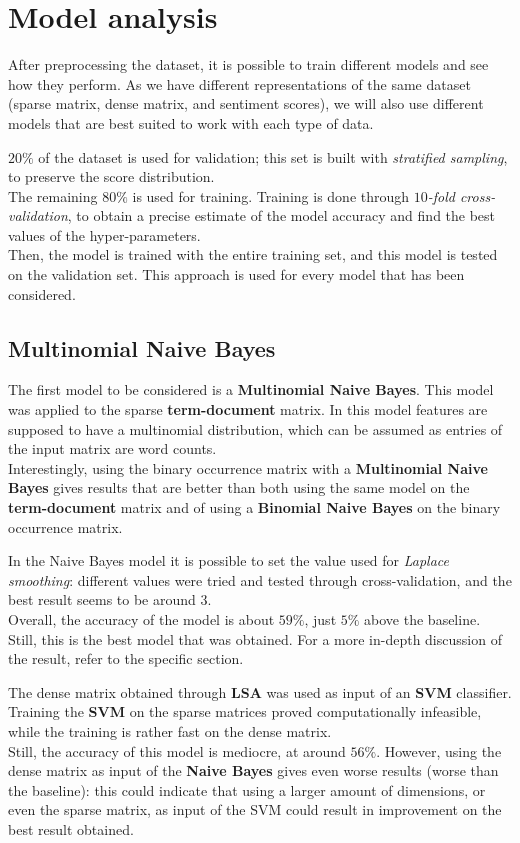 \documentclass[
12pt,
a4paper,
oneside,
headinclude,
footinclude]{article}
\theoremstyle{definition} %
\begin{document}
\section{Model analysis}
After preprocessing the dataset, it is possible to train different models and see how they perform. As we have different representations of the same dataset (sparse matrix, dense matrix, and sentiment scores), we will also use different models that are best suited to work with each type of data.

$20\%$ of the dataset is used for validation; this set is built with \textit{stratified sampling}, to preserve the score distribution.\\
The remaining $80\%$ is used for training. Training is done through \textit{$10$-fold cross-validation}, to obtain a precise estimate of the model accuracy and find the best values of the hyper-parameters. \\
Then, the model is trained with the entire training set, and this model is tested on the validation set.
This approach is used for every model that has been considered.

\subsection{Multinomial Naive Bayes}
The first model to be considered is a \textbf{Multinomial Naive Bayes}. This model was applied to the sparse \textbf{term-document} matrix. In this model features are supposed to have a multinomial distribution, which can be assumed as entries of the input matrix are word counts. \\
Interestingly, using the binary occurrence matrix with a \textbf{Multinomial Naive Bayes} gives results that are better than both using the same model on the \textbf{term-document} matrix and of using a \textbf{Binomial Naive Bayes} on the binary occurrence matrix.

In the Naive Bayes model it is possible to set the value used for \textit{Laplace smoothing}: different values were tried and tested through cross-validation, and the best result seems to be around $3$.\\
Overall, the accuracy of the model is about $59\%$, just $5\%$ above the baseline. Still, this is the best model that was obtained. For a more in-depth discussion of the result, refer to the specific section.

The dense matrix obtained through \textbf{LSA} was used as input of an \textbf{SVM} classifier. Training the \textbf{SVM} on the sparse matrices proved computationally infeasible, while the training is rather fast on the dense matrix. \\
Still, the accuracy of this model is mediocre, at around $56\%$. However, using the dense matrix as input of the \textbf{Naive Bayes} gives even worse results (worse than the baseline): this could indicate that using a larger amount of dimensions, or even the sparse matrix, as input of the SVM could result in improvement on the best result obtained.
\end{document}
